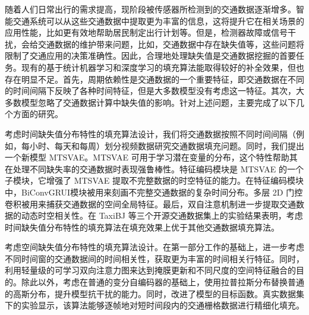 \begin{cabstract}

%
随着人们日常出行的需求提高，现阶段被传感器所检测到的交通数据逐渐增多。智能交通系统可以从这些交通数据中提取更为丰富的信息，这将提升它在相关场景的应用性能，比如更有效地帮助居民制定出行计划等。但是，检测器故障或信号干扰，会给交通数据的维护带来问题，比如，交通数据中存在缺失值等，这些问题将限制了交通应用的决策准确性。因此，合理地处理缺失值是交通数据挖掘的首要任务。现有的基于统计机器学习和深度学习的填充算法能取得较好的补全效果，但也存在明显不足。首先，周期依赖性是交通数据的一个重要特征，即交通数据在不同的时间间隔下反映了各种时间特征，但是大多数模型没有考虑这一特征。其次，大多数模型忽略了交通数据计算中缺失值的影响。针对上述问题，主要完成了以下几个方面的研究。

考虑时间缺失值分布特性的填充算法设计，我们将交通数据按照不同时间间隔（例如，每小时、每天和每周）划分视频数据研究交通数据填充问题。同时，我们提出一个新模型 MTSVAE。MTSVAE 可用于学习潜在变量的分布，这个特性帮助其在处理不同缺失率的交通数据时表现强鲁棒性。特征编码模块是 MTSVAE 的一个子模块，它增强了 MTSVAE 提取不完整数据的时空特征的能力。在特征编码模块中，BiConvGRUI模块被用来刻画不完整交通数据的复杂时间分布。多层 2D 门控卷积被用来捕获交通数据的空间全局特征。最后，双自注意机制进一步提取交通数据的动态时空相关性。在 TaxiBJ 等三个开源交通数据集上的实验结果表明，考虑时间缺失值分布特性的填充算法在填充效果上优于其他交通数据填充算法。

考虑空间缺失值分布特性的填充算法设计。在第一部分工作的基础上，进一步考虑不同时间窗的交通数据间的时间相关性，获取更为丰富的时间相关行特征。同时，利用轻量级的可学习双向注意力图来达到掩膜更新和不同尺度的空间特征融合的目的。除此以外，考虑在普通的变分自编码器的基础上，使用拉普拉斯分布替换普通的高斯分布，提升模型抗干扰的能力。同时，改进了模型的目标函数。真实数据集下的实验显示，该算法能够逐帧地对短时间段内的交通栅格数据进行精细化填充。
\end{cabstract}

